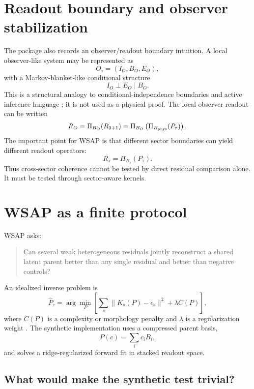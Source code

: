 \documentclass[12pt]{article}
\begin{document}
\section{Readout boundary and observer stabilization}

The package also records an observer/readout boundary intuition.  A local
observer-like system may be represented as
\[
  O_{\tau}=(I_O,B_O,E_O),
\]
with a Markov-blanket-like conditional structure
\[
  I_O \perp E_O \mid B_O.
\]
This is a structural analogy to conditional-independence boundaries and active
inference language \cite{Friston2010,Pearl2009}; it is not used as a physical
proof.  The local observer readout can be written
\[
  R_O=\Pi_{B_O}(R_{3+1})
      =\Pi_{B_O}\left(\Pi_{B_{\rm phys}}(P_{\tau})\right).
\]
The important point for WSAP is that different sector boundaries can yield
different readout operators:
\[
  R_s=\Pi_{B_s}(P_{\tau}).
\]
Thus cross-sector coherence cannot be tested by direct residual comparison
alone.  It must be tested through sector-aware kernels.

\section{WSAP as a finite protocol}

WSAP asks:
\begin{quote}
Can several weak heterogeneous residuals jointly reconstruct a shared latent
parent better than any single residual and better than negative controls?
\end{quote}

An idealized inverse problem is
\[
  \widehat P_{\tau}
  =
  \arg\min_P
  \left[
    \sum_s \|K_s(P)-\epsilon_s\|^2+\lambda C(P)
  \right],
  \label{eq:wsap-inverse}
\]
where \(C(P)\) is a complexity or morphology penalty and \(\lambda\) is a
regularization weight \cite{Tikhonov1963,Bishop2006}.  The synthetic
implementation uses a compressed parent basis,
\[
  P(c)=\sum_i c_iB_i,
\]
and solves a ridge-regularized forward fit in stacked readout space.

\subsection{What would make the synthetic test trivial?}
\end{document}
